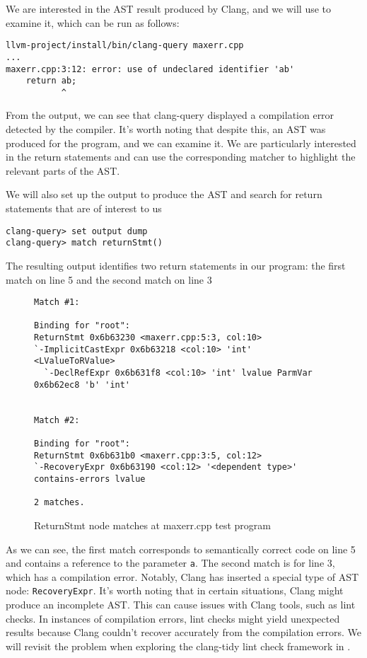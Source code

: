 We are interested in the AST result produced by Clang, and we will use
 to examine it, which can be run as follows:
\begin{adjustwidth}{0em}{0em}
\begin{verbatim}
llvm-project/install/bin/clang-query maxerr.cpp
...
maxerr.cpp:3:12: error: use of undeclared identifier 'ab'
    return ab;
           ^
\end{verbatim}
\end{adjustwidth}
From the output, we can see that clang-query displayed a compilation error
detected by the compiler. It's worth noting that despite this, an AST was
produced for the program, and we can examine it. We are particularly interested
in the return statements and can use the corresponding matcher to highlight the
relevant parts of the AST.

We will also set up the output to produce the AST and search for return statements that are of interest to us
\begin{adjustwidth}{0em}{0em}
\begin{verbatim}
clang-query> set output dump
clang-query> match returnStmt()
\end{verbatim}
\end{adjustwidth}

The resulting output identifies two return statements in our program: the first
match on line 5 and the second match on line 3
\begin{figure}[H]
\begin{adjustwidth}{0em}{0em}
\begin{verbatim}
Match #1:

Binding for "root":
ReturnStmt 0x6b63230 <maxerr.cpp:5:3, col:10>
`-ImplicitCastExpr 0x6b63218 <col:10> 'int' <LValueToRValue>
  `-DeclRefExpr 0x6b631f8 <col:10> 'int' lvalue ParmVar 0x6b62ec8 'b' 'int'


Match #2:

Binding for "root":
ReturnStmt 0x6b631b0 <maxerr.cpp:3:5, col:12>
`-RecoveryExpr 0x6b63190 <col:12> '<dependent type>' contains-errors lvalue

2 matches.
\end{verbatim}
\end{adjustwidth}
\caption{ReturnStmt node matches at maxerr.cpp test program}
\label{lis:ch3:maxerr:returnmatch}
\end{figure}
As we can see, the first match corresponds to semantically correct code on line 5
and contains a reference to the parameter \texttt{a}. The second match
is for line 3, which has a compilation error. Notably, Clang has inserted a
special type of AST node: \texttt{RecoveryExpr}. It's worth noting that
in certain situations, Clang might produce an incomplete AST. This can cause
issues with Clang tools, such as lint checks. In instances of compilation
errors, lint checks might yield unexpected results because Clang couldn't
recover accurately from the compilation errors. We will revisit the problem when
exploring the clang-tidy lint check framework in . 
\label{sec:ast:errors}


